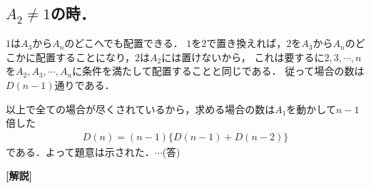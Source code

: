 \documentclass[a4paper,10pt]{ltjsarticle}
\begin{document}
\begin{multicols}{2}
  \subsection{$A_2 \ne 1$の時．}

  $1$は$A_3$から$A_n$のどこへでも配置できる．
  $1$を$2$で置き換えれば，$2$を$A_3$から$A_n$のどこかに配置することになり，$2$は$A_2$には置けないから，
  これは要するに$2,3,\cdots,n$を$A_2,A_3,\cdots, A_n$に条件を満たして配置することと同じである．
  従って場合の数は$D(n-1)$通りである．

  以上で全ての場合が尽くされているから，求める場合の数は$A_1$を動かして$n-1$倍した
  \begin{align*}
    D(n) = (n-1) \{ D(n-1) + D(n-2) \}
  \end{align*}
  である．よって題意は示された．$\cdots$(答)

  \vspace{10pt}
  {\bf[解説]}




  \newpage
\end{multicols}
\end{document}
